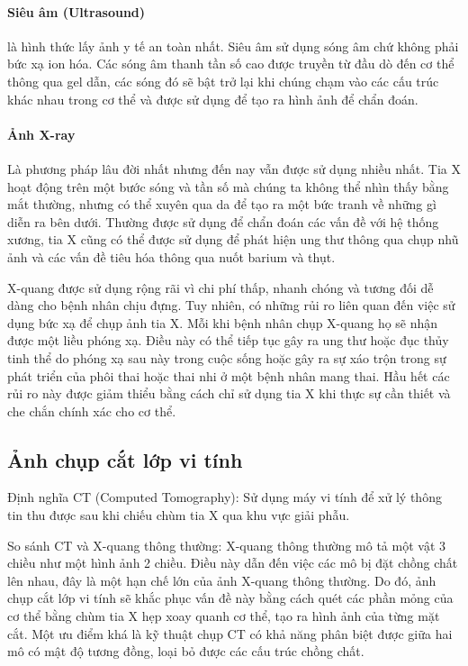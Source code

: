 \paragraph{Siêu âm (Ultrasound)}là hình thức lấy ảnh y tế an toàn nhất. Siêu âm sử dụng sóng âm chứ không phải bức xạ ion hóa. Các sóng âm thanh tần số cao được truyền từ đầu dò đến cơ thể thông qua gel dẫn, các sóng đó sẽ bật trở lại khi chúng chạm vào các cấu trúc khác nhau trong cơ thể và được sử dụng để tạo ra hình ảnh để chẩn đoán.
\vspace{-0.7cm}                
\paragraph{Ảnh X-ray} Là phương pháp lâu đời nhất nhưng đến nay vẫn được sử dụng nhiều nhất. Tia X hoạt động trên một bước sóng và tần số mà chúng ta không thể nhìn thấy bằng mắt thường, nhưng có thể xuyên qua da để tạo ra một bức tranh về những gì diễn ra bên dưới. Thường được sử dụng để chẩn đoán các vấn đề với hệ thống xương, tia X cũng có thể được sử dụng để phát hiện ung thư thông qua chụp nhũ ảnh và các vấn đề tiêu hóa thông qua nuốt barium và thụt.\par

X-quang được sử dụng rộng rãi vì chi phí thấp, nhanh chóng và tương đối dễ dàng cho bệnh nhân chịu đựng. Tuy nhiên, có những rủi ro liên quan đến việc sử dụng bức xạ để chụp ảnh tia X. Mỗi khi bệnh nhân chụp X-quang họ sẽ nhận được một liều phóng xạ. Điều này có thể tiếp tục gây ra ung thư hoặc đục thủy tinh thể do phóng xạ sau này trong cuộc sống hoặc gây ra sự xáo trộn trong sự phát triển của phôi thai hoặc thai nhi ở một bệnh nhân mang thai. Hầu hết các rủi ro này được giảm thiểu bằng cách chỉ sử dụng tia X khi thực sự cần thiết và che chắn chính xác cho cơ thể.

\subsection{Ảnh chụp cắt lớp vi tính}
Định nghĩa CT (Computed Tomography): Sử dụng máy vi tính để xử lý thông tin thu được sau khi chiếu chùm tia X qua khu vực giải phẫu. \par
So sánh CT và X-quang thông thường: X-quang thông thường mô tả một vật 3 chiều như một hình ảnh 2 chiều. Điều này dẫn đến việc các mô bị đặt chồng chất lên nhau, đây là một hạn chế lớn của ảnh X-quang thông thường. Do đó, ảnh chụp cắt lớp vi tính sẽ khắc phục vấn đề này bằng cách quét các phần mỏng của cơ thể bằng chùm tia X hẹp xoay quanh cơ thể, tạo ra hình ảnh của từng mặt cắt. Một ưu điểm khá là kỹ thuật chụp CT có khả năng phân biệt được giữa hai mô có mật độ tương đồng, loại bỏ được các cấu trúc chồng chất. \par

